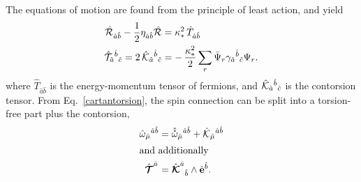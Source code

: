 \documentclass[twocolumn,showpacs,showkeys,prd,superscriptaddress]{revtex4-1}
\begin{document}
The equations of motion are found from the principle of least action, and yield
\begin{align}
  \label{einsteineom}
  \hat{{\mathcal{R}}}_{\hat{a}\hat{b}} - \frac{1}{2}{\eta}_{\hat{a}\hat{b}}\hat{{\mathcal{R}}} &= \kappa_*^2\,\hat{T}_{\hat{a}\hat{b}} \\
  \label{contorsionfound}
  \hat{\mathcal{T}}_{\hat{a}}{}^{\hat{b}}{}_{\hat{c}} = 2\,\hat{\mathcal{K}}_{\hat{a}}{}^{\hat{b}}{}_{\hat{c}} &= -\, \frac{\kappa_*^2}{2}\sum_{r}\bar{\Psi}_r\gamma_{\hat{a}}{}^{\hat{b}}{}_{\hat{c}}\Psi_r.
\end{align}
where $\hat{T}_{\hat{a}\hat{b}}$ is the energy-momentum tensor of fermions, and $\hat{\mathcal{K}}_{\hat{a}}{}^{\hat{b}}{}_{\hat{c}}$ is the contorsion tensor. From Eq.~\eqref{cartantorsion}, the spin connection can be split into a torsion-free part plus the contorsion,
\begin{align}
  \hat{\omega}_{\hat{\mu}}{}^{\hat{a}\hat{b}} &= \hat{\mathring{\omega}}_{\hat{\mu}}{}^{\hat{a}\hat{b}} + \hat{\mathcal{K}}_{\hat{\mu}}{}^{\hat{a}\hat{b}}\\
  \intertext{and additionally}
  \hat{{\boldsymbol{\mathcal{T}}}}^{\hat{a}_{}} &= {\hat{{\boldsymbol{\mathcal{K}}}}^{\hat{a}}{}_{\hat{b}}}\wedge \hat{{\bf{e}}}^{\hat{b}}  .
\end{align}
\end{document}
